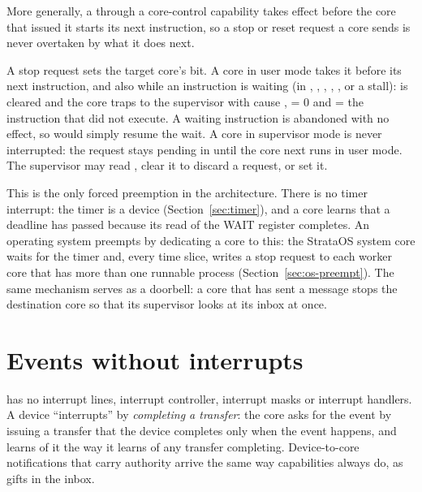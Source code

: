More generally, a  through a core-control capability takes effect before the core that
issued it starts its next instruction, so a stop or reset request a core sends is never overtaken by
what it does next.

A stop request sets the target core's  bit. A core in user mode takes it before its next
instruction, and also while an instruction is waiting (in , , ,
, ,  or a stall):  is cleared and the core traps to the
supervisor with cause ,  = 0 and  = the instruction that did not
execute. A waiting instruction is abandoned with no effect, so  would simply resume the
wait. A core in supervisor mode is never interrupted: the request stays pending in  until
the core next runs in user mode. The supervisor may read , clear it to discard a request, or
set it.

This is the only forced preemption in the architecture. There is no timer interrupt: the timer is a
device (Section~\ref{sec:timer}), and a core learns that a deadline has passed because its read of the
WAIT register completes. An operating system preempts by dedicating a core to this: the StrataOS system
core waits for the timer and, every time slice, writes a stop request to each worker core that has
more than one runnable process (Section~\ref{sec:os-preempt}). The same mechanism serves as a doorbell:
a core that has sent a message stops the destination core so that its supervisor looks at its inbox at
once.

\section{Events without interrupts}\label{sec:events}

\IS has no interrupt lines, interrupt controller, interrupt masks or interrupt handlers. A device
``interrupts'' by \emph{completing a transfer}: the core asks for the event by issuing a transfer that
the device completes only when the event happens, and learns of it the way it learns of any transfer
completing. Device-to-core notifications that carry authority arrive the same way capabilities always
do, as gifts in the inbox.

